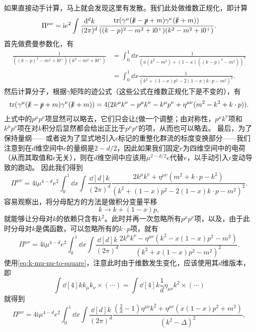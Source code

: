 \documentclass[hyperref, UTF8, a4paper]{ctexart}
\newcommand*{\ii}{\mathrm{i}}
\begin{document}
如果直接动手计算，马上就会发现这里有发散。我们此处做维数正规化，即计算
\begin{equation}
    \Pi^{\mu \nu} = \ii e^2 \int \frac{\dd[d]{k}}{(2\pi)^d} \frac{\trace (\gamma^\mu (\slashed{k} - \slashed{p} + m) \gamma^\nu (\slashed{k} + m))}{((k - p)^2 - m^2 + \ii 0^+) (k^2 - m^2 + \ii 0^+)}.
\end{equation}
首先做费曼参数化，有
\[
    \begin{aligned}
        \frac{1}{((k - p)^2 - m^2 + \ii 0^+) (k^2 - m^2 + \ii 0^+)} &= \int_0^1 \dd{x} \frac{1}{(x (k^2 - m^2) + (1-x) ((k - p)^2 - m^2))^2} \\
        &= \int_0^1 \dd{x} \frac{1}{(k^2 + (1-x) p^2 - 2(1-x) k \cdot p - m^2)^2}.
    \end{aligned}
\]
然后计算分子，根据$\gamma$矩阵的迹公式（这些公式在维数正规化下是不变的），有
\[
    \trace (\gamma^\mu (\slashed{k} - \slashed{p} + m) \gamma^\nu (\slashed{k} + m)) = 4 (2 k^\mu k^\nu - p^\mu k^\nu - k^\mu p^\nu + \eta^{\mu \nu} (m^2 - k^2 + k \cdot p)).
\]
上式中的$p^\mu p^\nu$项显然可以略去，它们只会让$\xi$做一个调整；由对称性，$p^\mu k^\nu$项和$k^\mu p^\nu$项在对$k$积分后显然都会给出正比于$p^\mu p^\nu$的项，从而也可以略去。
最后，为了保持量纲——或者说为了显式地引入$\epsilon$标记的重整化群流的标度变换部分——我们注意到在$d$维空间中$e$的量纲是$2-d/2$，因此如果我们固定$e$为四维空间中的电荷（从而其取值和$\epsilon$无关），则在$d$维空间中应该用$\mu^{2-d/2} e$代替$e$，以手动引入$\epsilon$变动导致的跑动。
因此我们得到
\[
    \Pi^{\mu \nu} = 4 \ii \mu^{4-d} e^2 \int_0^1 \dd{x} \int \frac{\dd[d]{k}}{(2\pi)^d} \frac{2k^\mu k^\nu + \eta^{\mu \nu} (m^2 + k \cdot p - k^2)}{(k^2 + (1-x) p^2 - 2(1-x) k \cdot p - m^2)^2}.
\]
容易观察出，将分母配方的方法是做积分变量平移
\[
    k \longrightarrow k + (1-x) p,
\]
就能够让分母对$k$的依赖只含有$k^2$。此时并再一次忽略所有$p^\mu p^\nu$项，以及，由于此时分母对$k$是偶函数，可以忽略所有的$k \cdot p$项，就有
\begin{equation}
    \Pi^{\mu \nu} = 4 \ii \mu^{4-d} e^2 \int_0^1 \dd{x} \int \frac{\dd[d]{k}}{(2\pi)^d} \frac{2k^\mu k^\nu - \eta^{\mu \nu} (k^2 - x(1-x)p^2 - m^2)}{(k^2 + x (1-x) p^2 - m^2)^2}.
\end{equation}
使用\eqref{eq:k-mu-nu-to-square}，注意此时由于维数发生变化，应该使用其$d$维版本，即
\begin{equation}
    \int \dd[4]{k} k_\mu k_\nu \times (\cdots) = \int \dd[4]{k} \frac{1}{d} \eta_{\mu \nu} k^2 \times (\cdots)
\end{equation}
就得到
\[
    \Pi^{\mu \nu} = 4 \ii \mu^{4-d} e^2 \int_0^1 \dd{x} \int \frac{\dd[d]{k}}{(2\pi)^d} \frac{(\frac{2}{d} - 1) \eta^{\mu \nu} k^2 + \eta^{\mu \nu} (x(1-x) p^2 + m^2)}{(k^2 - \Delta)^2},
\]
\end{document}
